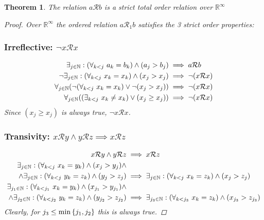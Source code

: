 \documentclass[]{article}
\newcommand{\Rel}{\mathcal{R}}
\newcommand{\R}{\mathbb{R}}
\newcommand{\N}{\mathbb{N}}
\newtheorem{theorem}{Theorem}
\begin{document}
\begin{theorem}
    The relation $a \Rel b$ is a strict total order relation over $\R^\infty$
    \begin{proof}
        Over $\R^\infty$ the ordered relation $a \Rel_1 b$ 
        satisfies the 3 strict order properties:

        \subsubsection{Irreflective: $\lnot x \Rel x$}
        \begin{align*}
            \exists_{j\in\N} : \qty(\forall_{k < j} \ a_k = b_k) \land (a_j > b_j) &\implies a \Rel b\\
            \lnot  \exists_{j\in\N} : \qty(\forall_{k < j} \ x_k = x_k) \land (x_j > x_j) &\implies \lnot  (x \Rel x)\\
            \forall_{j\in\N} \qty(\lnot \qty(\forall_{k < j} \ x_k = x_k) \lor \lnot (x_j > x_j)) &\implies \lnot  (x \Rel x)\\
            \forall_{j\in\N} \qty(\qty(\exists_{k < j} \ x_k \neq x_k) \lor (x_j \geq x_j)) &\implies \lnot  (x \Rel x)\\
        \end{align*}
        Since $(x_j \geq x_j)$ is always true, $\lnot x \Rel x$.
        
        \subsubsection{Transivity: $x \Rel y \land y \Rel z \implies x \Rel z$}
        \begin{align*}
            x \Rel y \land y \Rel z 
                &\implies x \Rel z\\
        \exists_{j\in\N} : \qty(\forall_{k < j} \ x_k = y_k) \land (x_j > y_j)\land&\\
            \land \exists_{j\in\N} : \qty(\forall_{k < j} \ y_k = z_k) \land (y_j > z_j)
            &\implies \exists_{j\in\N} : \qty(\forall_{k < j} \ x_k = z_k) \land (x_j >z_j)\\
        \exists_{j_1\in\N} : \qty(\forall_{k < j_1} \ x_k = y_k) \land (x_{j_1} > y_{j_1})\land&\\
            \land \exists_{j_2\in\N} : \qty(\forall_{k < j_2} \ y_k = z_k) \land (y_{j_2} > z_{j_2})
            &\implies \exists_{j_3\in\N} : \qty(\forall_{k < j_3} \ x_k = z_k) \land (x_{j_3} >z_{j_3})\\
        \end{align*}
        Clearly, for $j_3 \leq \min\qty{j_1,j_2}$ this is always true.


\end{proof}
\end{theorem}
\end{document}
